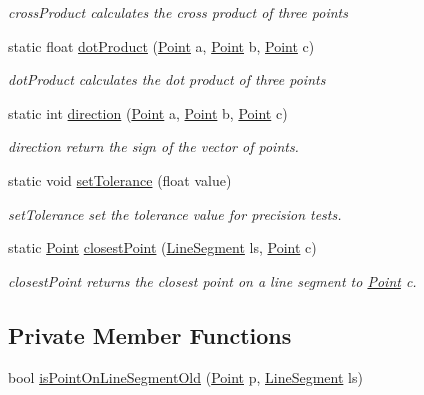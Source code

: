 \begin{DoxyCompactItemize}
\begin{DoxyCompactList}\small\item\em cross\+Product calculates the cross product of three points \end{DoxyCompactList}\item 
static float \hyperlink{class_intersect_tester_acf0fb2d4e58655d8314b2409a46900c2}{dot\+Product} (\hyperlink{class_point}{Point} a, \hyperlink{class_point}{Point} b, \hyperlink{class_point}{Point} c)
\begin{DoxyCompactList}\small\item\em dot\+Product calculates the dot product of three points \end{DoxyCompactList}\item 
static int \hyperlink{class_intersect_tester_a9d0a30b1831dbf7b80f8e2bfaf1b4a0b}{direction} (\hyperlink{class_point}{Point} a, \hyperlink{class_point}{Point} b, \hyperlink{class_point}{Point} c)
\begin{DoxyCompactList}\small\item\em direction return the sign of the vector of points. \end{DoxyCompactList}\item 
static void \hyperlink{class_intersect_tester_ac837c3469e328c8bb47d08742c304c9a}{set\+Tolerance} (float value)
\begin{DoxyCompactList}\small\item\em set\+Tolerance set the tolerance value for precision tests. \end{DoxyCompactList}\item 
static \hyperlink{class_point}{Point} \hyperlink{class_intersect_tester_a6bb20d4839643fbfd53a5d4506448a92}{closest\+Point} (\hyperlink{class_line_segment}{Line\+Segment} ls, \hyperlink{class_point}{Point} c)
\begin{DoxyCompactList}\small\item\em closest\+Point returns the closest point on a line segment to \hyperlink{class_point}{Point} c. \end{DoxyCompactList}\end{DoxyCompactItemize}
\subsection*{Private Member Functions}
\begin{DoxyCompactItemize}
\item 
bool \hyperlink{class_intersect_tester_af4b47b5b70e769205f6b113cb054f961}{is\+Point\+On\+Line\+Segment\+Old} (\hyperlink{class_point}{Point} p, \hyperlink{class_line_segment}{Line\+Segment} ls)
\end{DoxyCompactItemize}
